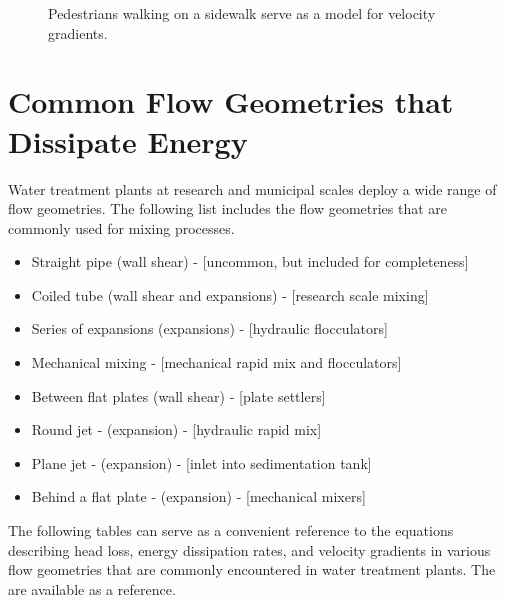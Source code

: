 \documentclass[letterpaper,10pt,english]{sphinxmanual}
\let\sphinxpxdimen\pdfpxdimen\else\newdimen\sphinxpxdimen
\begin{document}
\begin{figure}[htbp]
\centering
\capstart

\noindent\sphinxincludegraphics[width=700\sphinxpxdimen]{{Pedestrians_on_sidewalk}.jpg}
\caption{Pedestrians walking on a sidewalk serve as a model for velocity gradients.}\label{\detokenize{Rapid_Mix/RM_Intro:id12}}\label{\detokenize{Rapid_Mix/RM_Intro:figure-pedestrians-on-sidewalk}}\end{figure}


\section{Common Flow Geometries that Dissipate Energy}
\label{\detokenize{Rapid_Mix/RM_Intro:common-flow-geometries-that-dissipate-energy}}
Water treatment plants at research and municipal scales deploy a wide range of flow geometries. The following list includes the flow geometries that are commonly used for mixing processes.
\begin{itemize}
\item {} 
Straight pipe (wall shear) - {[}uncommon, but included for completeness{]}

\item {} 
Coiled tube (wall shear and expansions) - {[}research scale mixing{]}

\item {} 
Series of expansions (expansions) - {[}hydraulic flocculators{]}

\item {} 
Mechanical mixing - {[}mechanical rapid mix and flocculators{]}

\item {} 
Between flat plates (wall shear) - {[}plate settlers{]}

\item {} 
Round jet - (expansion) - {[}hydraulic rapid mix{]}

\item {} 
Plane jet - (expansion) - {[}inlet into sedimentation tank{]}

\item {} 
Behind a flat plate - (expansion) - {[}mechanical mixers{]}

\end{itemize}

The following tables can serve as a convenient reference to the equations describing head loss, energy dissipation rates, and velocity gradients in various flow geometries that are commonly encountered in water treatment plants. The {\hyperref[\detokenize{Rapid_Mix/RM_Derivations:heading-equations-varying-flow-geometries}]{}} are available as a reference.
\end{document}
